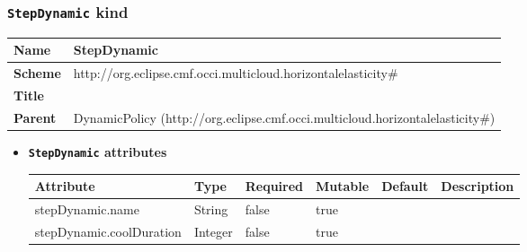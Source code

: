 \subsubsection{\texttt{StepDynamic} kind}
\begin{center}
\begin{tabular}{|l|l|}
  \hline
  \textbf{Name} & StepDynamic \\
  \hline  
  \textbf{Scheme} & http://org.eclipse.cmf.occi.multicloud.horizontalelasticity\# \\
  \hline
  \textbf{Title} &  \\
  \hline
  \textbf{Parent} & DynamicPolicy (http://org.eclipse.cmf.occi.multicloud.horizontalelasticity\#) \\
  \hline
\end{tabular}
\end{center}
\begin{itemize}
\item \textbf{\texttt{StepDynamic} attributes}

\begin{tabularx}{\textwidth}{|l|l|p{1.4cm}|p{1.3cm}|l|X|}
  \hline
  \textbf{Attribute} & \textbf{Type} & \textbf{Required} & \textbf{Mutable} & \textbf{Default} & \textbf{Description} \\
  \hline  
  stepDynamic.name & String & false & true &  &  \\
  \hline
  stepDynamic.coolDuration & Integer & false & true &  &  \\
  \hline
\end{tabularx}
\end{itemize}



